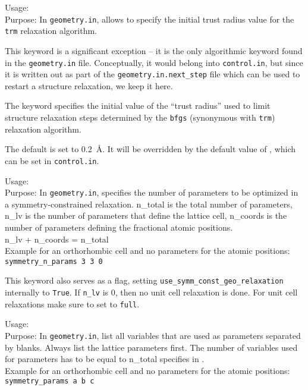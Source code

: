 {
  \noindent 
  Usage:   \\[1.0ex]
  Purpose: In \texttt{geometry.in}, allows to specify the initial
  trust radius value for the \texttt{trm} relaxation algorithm. \\ 
} 

This keyword is a significant exception -- it is the only
algorithmic keyword found in the \texttt{geometry.in}
file. Conceptually, it would belong into \texttt{control.in}, but
since it is written out as part of the \texttt{geometry.in.next\_step}
file which can be used to restart a structure relaxation, we keep it
here.

The keyword specifies the initial value of the ``trust radius'' used
to limit structure relaxation steps determined by the \texttt{bfgs}
(synonymous with \texttt{trm}) relaxation algorithm.

The default is set to 0.2~{\AA}. It will be overridden by the default
value of , which can be set in
\texttt{control.in}. 

{
  \noindent
  Usage:    \\[1.0ex]
  Purpose: In \texttt{geometry.in}, specifies the number of parameters to be optimized in a 
  symmetry-constrained relaxation. n\_total  is the total number of parameters, n\_lv is the 
  number of parameters that define the lattice cell,  n\_coords is the number of parameters defining the
  fractional atomic positions. \\
   n\_lv + n\_coords = n\_total \\
  Example for an orthorhombic cell and no parameters for the atomic positions:\\
  \texttt{symmetry\_n\_params  3  3  0}
}

This keyword also serves as a flag, setting \texttt{use\_symm\_const\_geo\_relaxation} internally to \texttt{True}.
If \texttt{n\_lv} is 0, then no unit cell relaxation is done. For unit cell relaxations make sure to set 
 to \texttt{full}.

{
  \noindent
  Usage:  \\[1.0ex]
  Purpose: In \texttt{geometry.in}, list all variables that are used as parameters separated by blanks.
  Always list the lattice parameters first. The number of variables used for parameters has to be equal
  to n\_total specifies in .\\
  Example for an orthorhombic cell and no parameters for the atomic positions:\\
  \texttt{symmetry\_params  a  b  c} 
}

